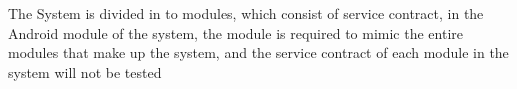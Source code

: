 The System is divided in to modules, which consist of service contract, in the Android module of the system, the module is required to mimic the entire modules that make up the system, and the service contract of each module in the system will not be tested  